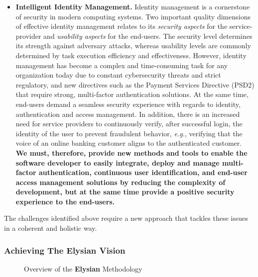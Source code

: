 \documentclass[a4paper,11pt]{article}
\newcommand{\project}[1]{\textbf{#1}\xspace}
\newcommand{\SECURITY}{\project{Elysian}}
\newcommand{\TheProject}{\SECURITY}
\begin{document}
\begin{itemize}
\item \textbf{Intelligent Identity Management.} 
Identity management is a cornerstone of security in modern computing systems. Two important quality dimensions of effective identity management relates to its \textit{security aspects} for the service-provider and \textit{usability aspects} for the end-users. The security level determines its strength against adversary attacks, whereas usability levels are commonly determined by task execution efficiency and effectiveness. However, identity management has become a complex and time-consuming task for any organization today due to constant cybersecurity threats and strict regulatory, and new directives such as the Payment Services Directive (PSD2) that require strong, multi-factor authentication solutions. At the same time, end-users demand a seamless security experience with regards to identity, authentication and access management. In addition, there is an increased need for service providers to continuously verify, after successful login, the identity of the user to prevent fraudulent behavior, \textit{e.g.}, verifying that the voice of an online banking customer aligns to the authenticated customer. \textbf{We must, therefore, provide new methods and tools to enable the software developer to easily integrate, deploy and manage multi-factor authentication, continuous user identification, and end-user access management solutions by reducing the complexity of development, but at the same time provide a positive security experience to the end-users.}

\end{itemize}


The challenges identified above require a new approach that tackles these issues in a coherent and
holistic way. 

\subsubsection{Achieving The \TheProject{} Vision}
\label{sect:elysian_vision}

\begin{figure}[tph!]
  \begin{center}
  \vspace{-5mm}
  \caption{Overview of the \TheProject{} Methodology}
  \label{fig:overview}
  \end{center}
  \end{figure}
\end{document}
